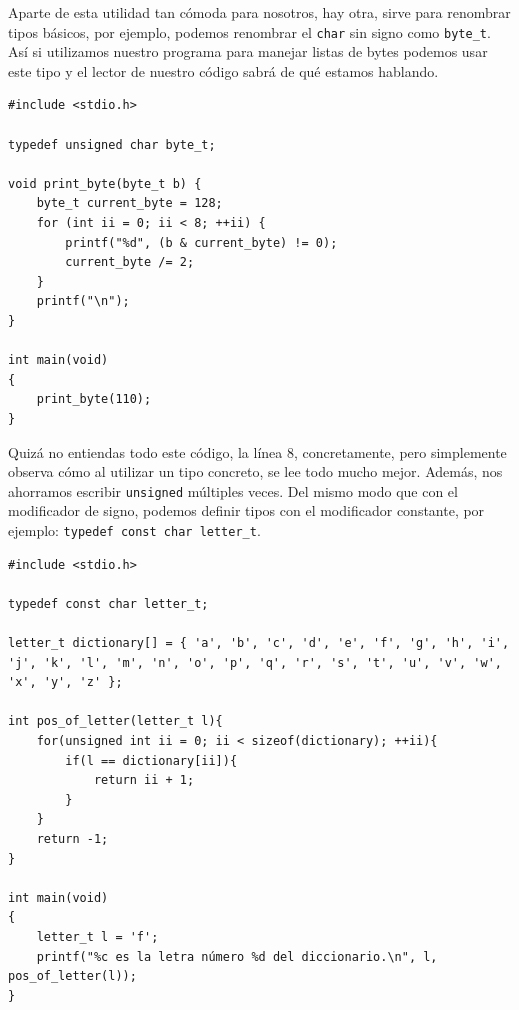 \documentclass[a4paper]{article}
\begin{document}
Aparte de esta utilidad tan cómoda para nosotros, hay otra, sirve para renombrar
tipos básicos, por ejemplo, podemos renombrar el \verb!char! sin signo como
\verb!byte_t!. Así si utilizamos nuestro programa para manejar listas de bytes
podemos usar este tipo y el lector de nuestro código sabrá de qué estamos
hablando.


\noindent
\begin{minipage}[H]{\linewidth}
\mbox{}
\begin{lstlisting}[style=C,
caption={Redefinición de un tipo básico},
label={lst:typedefBasicType}]
#include <stdio.h>

typedef unsigned char byte_t;

void print_byte(byte_t b) {
    byte_t current_byte = 128;
    for (int ii = 0; ii < 8; ++ii) {
        printf("%d", (b & current_byte) != 0);
        current_byte /= 2;
    }
    printf("\n");
}

int main(void)
{
    print_byte(110);
}
\end{lstlisting}
\end{minipage}

Quizá no entiendas todo este código, la línea 8, concretamente, pero simplemente
observa cómo al utilizar un tipo concreto, se lee todo mucho mejor. Además,
nos ahorramos escribir \verb!unsigned! múltiples veces.
Del mismo modo que con el
modificador de signo, podemos definir tipos con el modificador constante, por
ejemplo: \verb!typedef const char letter_t!.

\noindent
\begin{minipage}[H]{\linewidth}
\mbox{}
\begin{lstlisting}[style=C,
caption={Ejemplo de definición de tipo a partir de un tipo constante},
label={lst:typedefConstType}]
#include <stdio.h>

typedef const char letter_t;

letter_t dictionary[] = { 'a', 'b', 'c', 'd', 'e', 'f', 'g', 'h', 'i', 'j', 'k', 'l', 'm', 'n', 'o', 'p', 'q', 'r', 's', 't', 'u', 'v', 'w', 'x', 'y', 'z' };

int pos_of_letter(letter_t l){
    for(unsigned int ii = 0; ii < sizeof(dictionary); ++ii){
        if(l == dictionary[ii]){
            return ii + 1;
        }
    }
    return -1;
}

int main(void)
{
    letter_t l = 'f';
    printf("%c es la letra número %d del diccionario.\n", l, pos_of_letter(l));
}
\end{lstlisting}
\end{minipage}
\end{document}
